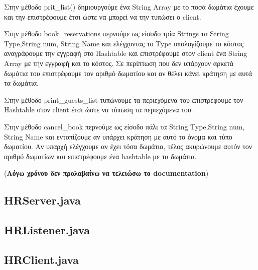 \noindent
Στην μέθοδο prit\_list() δημιουργούμε ένα String Array με το ποσά δωμάτια
έχουμε και την επιστρέφουμε έτσι ώστε να μπορεί να την τυπώσει ο client.

\noindent
Στην μέθοδο book\_reservations περνούμε ως είσοδο τρία Strings τα String Type,String num, String Name και ελέγχοντας το Type υπολογίζουμε το κόστος αναγράφουμε
την εγγραφή στο Hashtable και επιστρέφουμε στον client ένα String Array με
την εγγραφή και το κόστος. Σε περίπτωση που δεν υπάρχουν αρκετά δωμάτια
του επιστρέφουμε τον αριθμό δωματίου και αν θέλει κάνει κράτηση με αυτά τα
δωμάτια.

Στην μέθοδο print\_guests\_list τυπώνουμε τα περιεχόμενα του επιστρέφουμε
τον Hashtable στον client έτσι ώστε να τύπωση τα περιεχόμενα του.

Στην μέθοδο cancel\_book περνούμε ως είσοδο πάλι τα String Type,String num, String Name και εντοπίζουμε αν υπάρχει κράτηση με αυτό το όνομα και τύπο
δωματίου. Αν υπαρχή ελέγχουμε αν έχει τόσα δωμάτια, τέλος ακυρώνουμε 
αυτόν τον αριθμό δωματίων και επιστρέφουμε ένα hashtable με τα δωμάτια. 

(\textbf{Λόγω χρόνου δεν προλαβαίνω να τελειώσω το documentation})

\subsection{HRServer.java}

\subsection{HRListener.java}

\subsection{HRClient.java}


